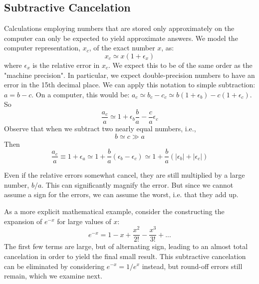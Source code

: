 \documentclass[../../../main.tex]{subfiles}
\begin{document}
\subsection{Subtractive Cancelation}
Calculations employing numbers that are stored only approximately on the computer can only be expected to yield approximate answers. 
We model the computer representation, $x_c$, of the exact number $x$, as:
\begin{equation*}
    x_c \simeq x ( 1 + \epsilon_x )
\end{equation*}
where $\epsilon_x$ is the relative error in $x_c$. 
We expect this to be of the same order as the "machine precision". In particular, we expect double-precision numbers to have an error in the 15th decimal place. 
We can apply this notation to simple subtraction: $a = b - c$.
On a computer, this would be: $a_c \simeq b_c - c_c \simeq b(1+\epsilon_b) - c( 1 + \epsilon_c)$.
So
\begin{equation*}
    \frac{a_c}{a} \simeq 1 + \epsilon_b \frac{b}{a} - \frac{c}{a} \epsilon_c
\end{equation*}
Observe that when we subtract two nearly equal numbers, i.e.,
\begin{equation*}
    b \simeq c \gg a
\end{equation*}
Then
\begin{equation*}
    \frac{a_c}{a} \equiv 1 + \epsilon_a \simeq 1 + \frac{b}{a} (\epsilon_b - \epsilon_c) \simeq 1 + \frac{b}{a}(|\epsilon_b|+|\epsilon_c|)
\end{equation*}

Even if the relative errors somewhat cancel, they are still multiplied by a large number, $b/a$. 
This can significantly magnify the error. But since we cannot assume a sign for the errors, we can assume the worst, i.e. that they add up. 

As a more explicit mathematical example, consider the constructing the expansion of $e^{-x}$ for large values of $x$:
\begin{equation*}
    e^{-x} = 1 - x + \frac{x^2}{2!} - \frac{x^3}{3!} + ... 
\end{equation*}
The first few terms are large, but of alternating sign, leading to an almost total cancelation in order to yield the final small result. 
This subtractive cancelation can be eliminated by considering $e^{-x} = 1/e^x$ instead, but round-off errors still remain, which we examine next. 
\end{document}

